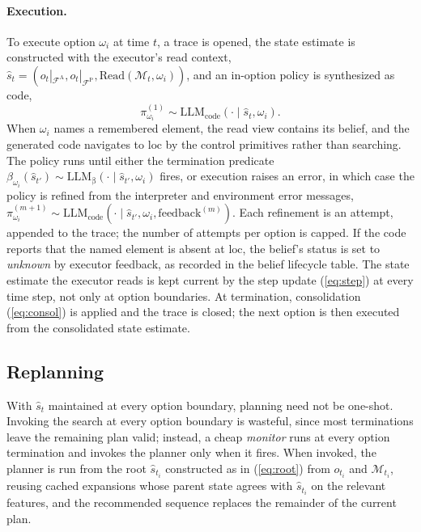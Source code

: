 \documentclass[11pt]{article}
\newcommand{\llm}[1]{\mathrm{LLM}_{\mathrm{#1}}}
\newcommand{\calF}{\mathcal{F}}
\newcommand{\calM}{\mathcal{M}}
\newcommand{\shat}{\hat{s}}
\newcommand{\FA}{\calF^{\mathrm{A}}}
\newcommand{\FP}{\calF^{\mathrm{P}}}
\newcommand{\Read}{\mathrm{Read}}
\newcommand{\loc}{\mathrm{loc}}
\begin{document}
\paragraph{Execution.}
To execute option $\omega_i$ at time $t$, a trace is opened, the state estimate is constructed with the executor's read context, $\shat_t=(o_t|_{\FA},o_t|_{\FP},\Read(\calM_t,\omega_i))$, and an in-option policy is synthesized as code,
\begin{equation}
\pi^{(1)}_{\omega_i}\sim\llm{code}(\cdot\mid\shat_t,\omega_i).
\label{eq:code}
\end{equation}
When $\omega_i$ names a remembered element, the read view contains its belief, and the generated code navigates to $\loc$ by the control primitives rather than searching. The policy runs until either the termination predicate $\beta_{\omega_i}(\shat_{t'})\sim\llm{\beta}(\cdot\mid\shat_{t'},\omega_i)$ fires, or execution raises an error, in which case the policy is refined from the interpreter and environment error messages, $\pi^{(m+1)}_{\omega_i}\sim\llm{code}(\cdot\mid\shat_{t'},\omega_i,\mathrm{feedback}^{(m)})$. Each refinement is an attempt, appended to the trace; the number of attempts per option is capped. If the code reports that the named element is absent at $\loc$, the belief's status is set to \emph{unknown} by executor feedback, as recorded in the belief lifecycle table. The state estimate the executor reads is kept current by the step update (\ref{eq:step}) at every time step, not only at option boundaries. At termination, consolidation (\ref{eq:consol}) is applied and the trace is closed; the next option is then executed from the consolidated state estimate.

\subsection{Replanning}
\label{sec:type1-replan}

With $\shat_t$ maintained at every option boundary, planning need not be one-shot. Invoking the search at every option boundary is wasteful, since most terminations leave the remaining plan valid; instead, a cheap \emph{monitor} runs at every option termination and invokes the planner only when it fires. When invoked, the planner is run from the root $\shat_{t_i}$ constructed as in (\ref{eq:root}) from $o_{t_i}$ and $\calM_{t_i}$, reusing cached expansions whose parent state agrees with $\shat_{t_i}$ on the relevant features, and the recommended sequence replaces the remainder of the current plan.
\end{document}
